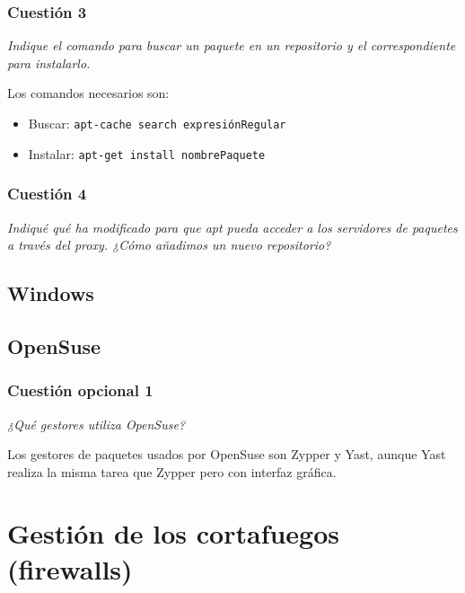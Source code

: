\subsubsection{Cuestión 3}
\textit{Indique el comando para buscar un paquete en un repositorio y el correspondiente para instalarlo.}
\newline

Los comandos necesarios son: \cite{manapt1} \cite{manapt2}
\begin{itemize}
  \item Buscar: \texttt{apt-cache search expresiónRegular }
  \item Instalar: \texttt{apt-get install nombrePaquete}
\end{itemize}
\subsubsection{Cuestión 4}
\textit{Indiqué qué ha modificado para que apt pueda acceder a los servidores de paquetes a través del proxy. ¿Cómo añadimos un nuevo repositorio?}
\newline


\subsection{Windows}

\subsection{OpenSuse}
\subsubsection{Cuestión opcional 1}
\textit{¿Qué gestores utiliza OpenSuse?}
\newline
 
Los gestores de paquetes usados por OpenSuse son Zypper y Yast, aunque Yast realiza la misma tarea que Zypper pero con interfaz gráfica. \cite{os1} \cite{os2} \cite{os3}

\section{Gestión de los cortafuegos (firewalls)}
